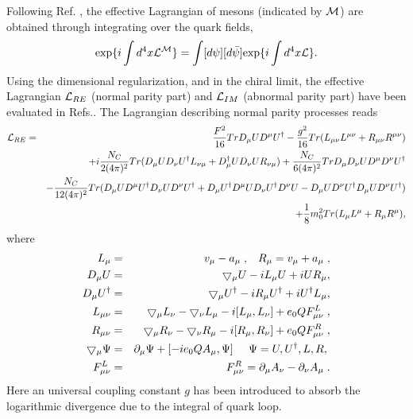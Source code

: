 Following Ref. \cite{Li1}, the effective Lagrangian of mesons (indicated
by ${\cal M}$) are obtained through integrating over the quark fields,
\begin{equation}
{\rm exp}\{i\int d^4 x {\cal L^M}\}=
\int [d\psi][d\bar{\psi}]{\rm exp}\{i\int d^4 x {\cal L}\}.
\end{equation}
Using the dimensional regularization, and in the chiral limit,
 the effective Lagrangian ${\cal L}_{RE}$ (normal parity
part) and ${\cal L}_{IM}$ (abnormal parity part) have been evaluated
in Refs.\cite{Li1}. The Lagrangian describing normal parity processes
reads
\begin{eqnarray} \label{lag}
{\cal
L}_{RE}&=&{F^2\over 16}TrD_{\mu}UD^{\mu}U^\dagger
-{\frac{g^2}{16}}Tr(L_{\mu\nu}L^{\mu\nu}+R_{\mu\nu}R^{\mu\nu})\nonumber\\
& &+i\frac{N_C}{2(4\pi)^2}Tr(D_{\mu}UD_{\nu}U^{\dagger}L_{\nu\mu}+
D_{\mu}^{\dagger}UD_{\nu}UR_{\nu\mu})
+\frac{N_C}{6(4\pi)^2}TrD_{\mu}D_{\nu}UD^{\mu}D^{\nu}U^\dagger\nonumber\\
& &-\frac{N_C}{12(4\pi)^2}
   Tr(D_{\mu}UD^{\mu}U^{\dagger}D_{\nu}UD^{\nu}U^\dagger+
   D_{\mu}U^{\dagger}D^{\mu}UD_{\nu}U^{\dagger}D^{\nu }U-
   D_{\mu}UD^{\nu}U^{\dagger}D_{\mu}UD^{\nu}U^\dagger)\nonumber\\
& &+{1\over 8}m_0^2Tr(L_{\mu}L^{\mu}+R_{\mu}R^{\mu}),
\end{eqnarray}
where
\begin{eqnarray}
L_\mu&=&v_\mu-a_\mu \;,\;\;\;
R_\mu=v_\mu+a_\mu \;,\nonumber\\
D_{\mu} U&=&\bigtriangledown _\mu U-iL_\mu U+iUR_\mu,\nonumber\\
D_{\mu} U^\dagger&=&\bigtriangledown_\mu U^\dagger-iR_\mu U^\dag+iU^\dag L_\mu, 
\nonumber\\
L_{\mu\nu}&=&\bigtriangledown_{\mu}L_\nu-\bigtriangledown_{\nu}L_\mu-i[L_\mu,L_\nu]+e_0Q
F^L_{\mu\nu}\;,\nonumber\\
R_{\mu\nu}&=&\bigtriangledown_{\mu}R_\nu-\bigtriangledown_{\nu}R_\mu-i[R_\mu,R_\nu]+e_0Q
F^R_{\mu\nu}\;, \nonumber\\
\bigtriangledown_{\mu}\Psi&=&\partial_{\mu}\Psi+[-ie_0QA_{\mu},\Psi]
\;\;\;\;\; \Psi=U,U^\dagger,L,R,\; \nonumber\\
F^L_{\mu\nu}&=&F^R_{\mu\nu}=\partial_\mu A_\nu-\partial_\nu A_\mu\;.
\end{eqnarray}
Here an universal coupling constant $g$ has been introduced to absorb the
logarithmic divergence due to the integral of quark loop.

